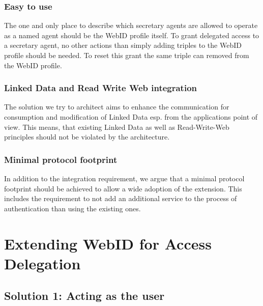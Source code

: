\documentclass[a4paper]{llncs}
\begin{document}
\subsubsection{Easy to use}
The one and only place to describe which secretary agents are allowed to operate as a named agent should be the WebID profile itself.
To grant delegated access to a secretary agent, no other actions than simply adding triples to the WebID profile should be needed.
To reset this grant the same triple can removed from the WebID profile. 

\subsubsection{Linked Data and Read Write Web integration}

The solution we try to architect aims to enhance the communication for consumption and modification of Linked Data esp. from the applications point of view.
This means, that existing Linked Data as well as Read-Write-Web principles should not be violated by the architecture.

\subsubsection{Minimal protocol footprint}

In addition to the integration requirement, we argue that a minimal protocol footprint should be achieved to allow a wide adoption of the extension.
This includes the requirement to not add an additional service to the process of authentication than using the existing ones.

 

\section{Extending WebID for Access Delegation}\label{sec:spec}

\subsection{Solution 1: Acting as the user}
\end{document}
